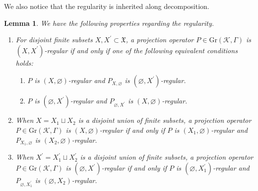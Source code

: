 \documentclass[pdftex]{sigma}
\numberwithin{equation}{section}
\newtheorem{Lemma}[Theorem]{Lemma}
\newcommand{\pr}[1]{#1^{\prime}}
\newcommand{\mfrak}[1]{\mathfrak{#1}}
\newcommand{\mcal}[1]{\mathcal{#1}}
\newcommand{\mrm}[1]{\mathrm{#1}}
\begin{document}
We also notice that the regularity is inherited along decomposition.
\begin{Lemma}\label{lem:regularity_decomp} We have the following properties regarding the regularity.
\begin{enumerate}\itemsep=0pt
\item[$1.$] 	For disjoint finite subsets $X,\pr{X}\subset\mfrak{X}$, a projection operator $P\in\mrm{Gr}(\mcal{K},\Gamma)$ is $(X,\pr{X})$-regular if and only if one of the following equivalent conditions holds:
		\begin{enumerate}\itemsep=0pt
		\item[$(a)$] 	$P$ is $(X,\varnothing)$-regular and $P_{X,\varnothing}$ is $(\varnothing,\pr{X})$-regular.
		\item[$(b)$] 	$P$ is $(\varnothing,\pr{X})$-regular and $P_{\varnothing,\pr{X}}$ is $(X,\varnothing)$-regular.
		\end{enumerate}
\item[$2.$] 	When $X=X_{1}\sqcup X_{2}$ is a disjoint union of finite subsets, a projection operator $P\in\mrm{Gr}(\mcal{K},\Gamma)$ is $(X,\varnothing)$-regular if and only if $P$ is $(X_{1},\varnothing)$-regular and $P_{X_{1},\varnothing}$ is $(X_{2},\varnothing)$-regular.
\item[$3.$] 	When $\pr{X}=\pr{X}_{1}\sqcup \pr{X}_{2}$ is a disjoint union of finite subsets, a projection operator $P\in\mrm{Gr}(\mcal{K},\Gamma)$ is $(\varnothing,\pr{X})$-regular if and only if $P$ is $(\varnothing,\pr{X}_{1})$-regular and $P_{\varnothing,\pr{X}_{1}}$ is $(\varnothing,X_{2})$-regular.
\end{enumerate}
\end{Lemma}
\end{document}
